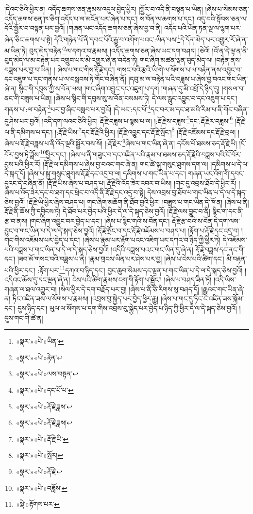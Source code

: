 །དེའང་ཅིའི་ཕྱིར་ན། འདོད་ཆགས་ཅན་རྣམས་འདུལ་བྱེད་ཕྱིར། །སྦྱོར་བ་འདི་ནི་བསྟན་པ་ཡིན། །ཞེས་པ་སེམས་ཅན་འདོད་ཆགས་ཅན་ཁ་ཅིག་འདོད་པ་ལ་མངོན་པར་ཞེན་པ་དང་། ས་བོན་ལ་ཆགས་པ་དང་། འདུ་བའི་སྟོབས་ཅན་ལ་དེའི་སྦྱོར་བ་བསྟན་པར་བྱའོ། །གཞན་ཡང་འདོད་ཆགས་ཅན་ཞེས་བྱ་བ་ནི། འདོད་པའི་ཡོན་ཏན་ལྔ་ལ་ལྷག་པར་ཞེན་ཅིང་ཆགས་པ་སྟེ། དེའི་གཉེན་པོ་ནི་དབང་པོའི་རྒྱུ་བ་འགོག་པའང་:ཡིན་པས་\footnote{«སྣར་»«པེ་»ཡིན་}དེ་དོན་མེད་པར་འགྱུར་རོ་ཞེ་ན་མ་ཡིན་ཏེ། བུད་མེད་བརྟེན་\footnote{«སྣར་»«པེ་»རྟེན་}ལ་དགའ་བ་རྣམས། །འདོད་ཆགས་ཅན་ཞེས་ཡང་དག་བཤད། །ཅེའོ། །འོ་ན་དེ་ལྟ་ན་ནི་བུད་མེད་ལ་མ་བརྟེན་པར་འགྲུབ་པར་མི་འགྱུར་ཞེ་ན་བདེན་ཏེ། གང་ཞིག་མཚན་ལྡན་བུད་མེད་ལ། །བརྟེན་ནས་བཟླས་པར་བྱ་བ་ཡིན། །
ཞེས་པ་གང་གིས་རྡོ་རྗེ་དང་། གསང་བའི་རྩའི་ཡི་གེ་ལ་སོགས་པ་ལ་བརྟེན་ནས་འབྱུང་བ་དང་འཇུག་པ་དང་གནས་པ་ལ་བསླབས་ཏེ་གོང་བཞིན་ནོ། །དབུ་མ་ལ་བརྟེན་པའི་བཟླས་པ་ཞེས་བྱ་བའང་གང་ཡིན་ཞེ་ན། སྙིང་གི་དབུས་ཀྱི་ས་བོན་ལས། །གང་ཞིག་འབྱུང་དང་འཇུག་པ་དག །གཞན་དུ་མི་འཕྲོ་དེ་ཉིད་དུ། །གསལ་བ་ནང་གི་བཟླས་པ་ཡིན། །ཞེས་པ་སྙིང་གི་དབུས་སུ་ས་བོན་བསམས་ཏེ། དེ་ལས་རླུང་འབྱུང་བ་དང་འཇུག་པ་དང་། གནས་པ་:ལ་བརྟེན་\footnote{«སྣར་»«པེ་»ལས་བསྟན་}པར་བྱ་ཞིང་བསླབ་པར་བྱའོ། །དེ་ཡང་:དང་པོ་\footnote{«སྣར་»«པེ་»དང་པོ་པ་}དང་བར་མ་དང་ཐ་མའི་རིམ་པ་ནི་གོང་བཞིན་དུ་ཤེས་པར་བྱའོ། །འདི་དག་ལའང་ཅིའི་ཕྱིར། རྡོ་རྗེ་བཟླས་པ་སྙམ་པ་ལ། །:རྡོ་རྗེས་བཟླས་\footnote{«སྣར་»«པེ་»རྡོ་རྗེ་ཟླས་}དང་:རྡོ་རྗེར་བཟླས།\footnote{«སྣར་»«པེ་»རྡོ་རྗེ་ཟླས།} །རྡོ་རྗེ་ལ་ནི་དམིགས་པ་དང་། །:རྡོ་རྗེ་ཡིས་\footnote{«སྣར་»«པེ་»རྡོ་རྗེ་ཡི་}དང་རྡོ་རྗེའི་ཕྱིར། །རྡོ་རྗེ་འབྱུང་དང་རྡོ་རྗེ་སྤོང་།\footnote{«སྣར་»«པེ་»སྤོར།} །རྡོ་རྗེ་འཇོམས་དང་རྡོ་རྗེ་བྲལ། །ཞེས་པ་རྡོ་རྗེ་བཟླས་པ་ནི་འོད་ལྔའི་སྦྱོར་བས་སོ། །:རྡོ་རྗེར་\footnote{«སྣར་»«པེ་»རྡོ་རྗེ་}ཞེས་པ་གང་ཡིན་ཞེ་ན། དངོས་པོ་ཐམས་ཅད་རྡོ་རྗེ་ཡི། །ངོ་བོར་བྱས་ཏེ་ཟློས་\footnote{«སྣར་»«པེ་»བཟློས་}ཕྱིར་དང་། །ཞེས་པ་ནི་གཟུང་བ་དང་འཛིན་པའི་རྣམ་པ་ཐམས་ཅད་རྡོ་རྗེའི་བཟླས་པའི་ངོ་བོར་བྱས་པའི་ཕྱིར་རོ། །རྡོ་རྗེ་ལ་དམིགས་པ་ཞེས་བྱ་བའང་གང་ཞེ་ན། གང་ཚེ་སྐུ་གསུང་ཐུགས་དག་ལ། །དམིགས་པ་དེ་ལ་དེ་སྐད་དོ། །ཞེས་པ་སྐུ་གསུང་ཐུགས་རྡོ་རྗེ་དང་འདྲ་བ་ལ། དམིགས་པ་གང་ཡིན་པ་དང་། གཞན་ཡང་འོག་གི་དབང་དུའང་དེ་བཞིན་ནོ། །རྡོ་རྗེ་ཡིས་ཞེས་པ་བཤད་པ། རྡོ་རྗེའི་འོད་ཟེར་འབར་བ་ཡིས། །གང་དུ་འབྲས་ཐོབ་དེ་ཕྱིར་རོ། །ཞེས་པ་འོད་ཟེར་དང་བ་ཐག་དང་ཕྲེང་བ་འདི་ནི་རྡོ་རྗེ་དང་འདྲ་བ་སྟེ། དེས་འབྲས་བུ་ཐོབ་པ་གང་ཡིན་པ་དེ་ལ་དེ་སྐད་ཅེས་བྱའོ། །རྡོ་རྗེ་ཡི་ཕྱིར་ཞེས་བཤད་པ། གང་ཞིག་མཆོག་ནི་ཐོབ་བྱའི་ཕྱིར། །བཟླས་པ་གང་ཡིན་དེ་ཁོ་ན། །ཞེས་པ་ནི། རྡོ་རྗེ་ནི་ཆོས་ཀྱི་དབྱིངས་ཏེ། དེ་ཐོབ་པར་བྱེད་པའི་ཕྱིར་དེ་ལ་དེ་སྐད་ཅེས་བྱའོ། །རྡོ་རྗེ་ལས་བྱུང་བ་ནི། སྙིང་ག་དང་ནི་རྩ་བ་ནས། །གང་ཞིག་འབྱུང་བར་བྱེད་པ་དང་། །ཞེས་པ་སྙིང་གའི་ས་བོན་དང་། རྡོ་རྗེ་རྩ་བའི་ས་བོན་དེ་དག་ལས་བྱུང་བ་གང་ཡིན་པ་དེ་ལ་དེ་སྐད་ཅེས་བྱའོ། །རྡོ་རྗེ་སྤོང་བ་དང་རྡོ་རྗེ་འཇོམས་པ་བཤད་པ། །རྟོག་པ་རྡོ་རྗེ་དང་འདྲ་བ། །གང་གིས་འཇོམས་པར་བྱེད་པ་དང་། །ཞེས་པ་རྣམ་པར་རྟོག་པའང་འཇིག་པར་དཀའ་བ་ཉིད་ཀྱི་ཕྱིར་ཏེ། དེ་འཇོམས་པའི་བཟླས་པ་གང་ཡིན་པ་དེ་ལ་དེ་སྐད་ཅེས་བྱའོ། །འདིའི་བཟླས་པའང་གང་ཡིན་དུ་ཞེ་ན། རྡོ་རྗེ་བཟླས་དང་ནང་གི་དང་། །ཟབ་མོ་གསང་བའི་བཟླས་པ་ནི། །རྣམ་གྲངས་ཡིན་པར་ཤེས་པར་བྱ། །ཞེས་པ་ངེས་པའི་ཚིག་དང་། མི་བརྟན་པའི་ཕྱིར་དང་། :རྟོག་པར་\footnote{«སྡེ་»རྟོགས་པར་}དཀའ་བ་ཉིད་དང་། བྱང་ཆུབ་སེམས་དང་ལྡན་པ་གང་ཡིན་པ་དེ་ལ་དེ་སྐད་ཅེས་བྱའོ། །འདིའང་ཆོས་དུ་དང་ལྡན་ཞེ་ན། ངེས་པའི་ཚིག་རྣམས་ངག་གི་རྟོག་པ་སྦྱོང་། །ཞེས་པ་བཤད་ཟིན་ཏོ། །འདི་ཡིས་གཞན་ལ་ཐལ་འགྱུར་བ། །སེལ་ཕྱིར་དེ་དག་བརྗོད་པར་བྱ། །ཞེས་པ་ནི་ཅི་རིགས་སུ་བཤད་དོ། །རྒྱུའང་གང་ཡིན་ཞེ་ན། ཏིང་འཛིན་ཟས་ལ་སོགས་པ་རྣམས། །འབྲས་བུ་སྐྱེད་པར་བྱེད་ཕྱིར་རྒྱུ། །ཞེས་པ་གང་དུ་ཏིང་ངེ་འཛིན་ཟས་སྐོམ་དང་། དུས་ཉིད་དང་། ཡུལ་ལ་སོགས་པ་དག་གིས་འབྲས་བུ་སྐྱེད་པར་བྱེད་པ་ཉིད་ཀྱི་ཕྱིར་དེ་ལ་དེ་སྐད་ཅེས་བྱའོ། །དུས་གང་གི་ཚེ་ན། 